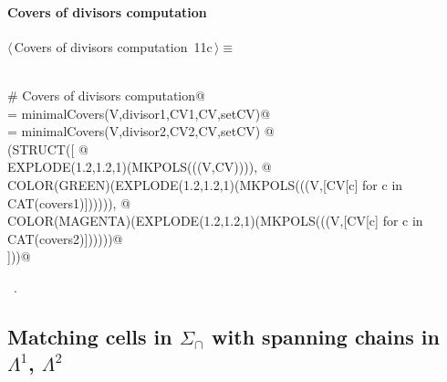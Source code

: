 \documentclass[11pt,oneside]{article}	%
\begin{document}
\paragraph{Covers of divisors computation}
\begin{flushleft} \small \label{scrap20}
\protect{}$\langle\,$Covers of divisors computation\nobreak\ {\footnotesize 11c}$\,\rangle\equiv$
\vspace{-1ex}
\begin{list}{}{} \item
\mbox{}\verb@@\\
\mbox{}\verb@# Covers of divisors computation@\\
\mbox{} = minimalCovers(V,divisor1,CV1,CV,setCV)@\\
\mbox{} = minimalCovers(V,divisor2,CV2,CV,setCV)   @\\
\mbox{}\verb@VIEW(STRUCT([ @\\
\mbox{}\verb@   EXPLODE(1.2,1.2,1)(MKPOLS(((V,CV)))), @\\
\mbox{}\verb@   COLOR(GREEN)(EXPLODE(1.2,1.2,1)(MKPOLS(((V,[CV[c] for c in CAT(covers1)]))))), @\\
\mbox{}\verb@   COLOR(MAGENTA)(EXPLODE(1.2,1.2,1)(MKPOLS(((V,[CV[c] for c in CAT(covers2)])))))@\\
\mbox{}\verb@    ]))@\\
\mbox{}\verb@@{\NWsep}
\end{list}
\vspace{-1ex}
\footnotesize\addtolength{\baselineskip}{-1ex}
\begin{list}{}{\setlength{\itemsep}{-\parsep}\setlength{\itemindent}{-\leftmargin}}
\item \NWtxtMacroRefIn\ .
\end{list}
\end{flushleft}


\subsection{Matching cells in $\Sigma_\cap$ with spanning chains in $\Lambda^1$, $\Lambda^2$}
\end{document}
